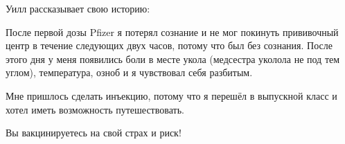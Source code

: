 Уилл рассказывает свою историю:

После первой дозы Pfizer я потерял сознание и не мог покинуть прививочный центр
в течение следующих двух часов, потому что был без сознания. После этого дня у
меня появились боли в месте укола (медсестра уколола не под тем углом),
температура, озноб и я чувствовал себя разбитым.

Мне пришлось сделать инъекцию, потому что я перешёл в выпускной класс и хотел
иметь возможность путешествовать.

Вы вакцинируетесь на свой страх и риск!
